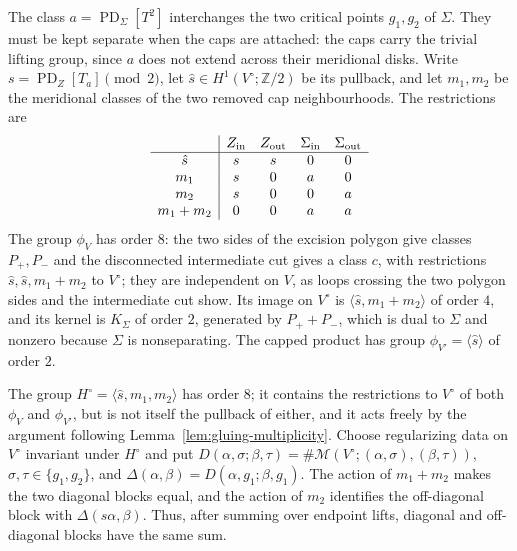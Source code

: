 \documentclass[11pt]{amsart}
\theoremstyle{definition}
\theoremstyle{remark}
\theoremstyle{plain}
\numberwithin{equation}{section}
\newcommand{\ZZ}{\mathbb Z}
\newcommand{\PD}{\operatorname{PD}}
\begin{document}
The class $a=\PD_\Sigma[T^2]$ interchanges the two critical points $g_1,g_2$
of $\Sigma$. They must be kept separate when the caps are attached: the caps
carry the trivial lifting group, since $a$ does not extend across their
meridional disks. Write $s=\PD_Z[T_a]\pmod2$, let $\hat s\in H^1(V^\circ;\ZZ/2)$
be its pullback, and let $m_1,m_2$ be the meridional classes of the two
removed cap neighbourhoods. The restrictions are
\[
\begin{array}{c|cccc}
 &Z_{\rm in}&Z_{\rm out}&\Sigma_{\rm in}&\Sigma_{\rm out}\\\hline
 \hat s&s&s&0&0\\
 m_1&s&0&a&0\\
 m_2&s&0&0&a\\
 m_1+m_2&0&0&a&a
\end{array}
\]
The group $\phi_V$ has order $8$: the two sides of the excision polygon give
classes $P_+,P_-$ and the disconnected intermediate cut gives a class $c$,
with restrictions $\hat s,\hat s,m_1+m_2$ to $V^\circ$; they are independent
on $V$, as loops crossing the two polygon sides and the intermediate cut show.
Its image on $V^\circ$ is $\langle\hat s,m_1+m_2\rangle$ of order $4$, and its
kernel is $K_\Sigma$ of order $2$, generated by $P_++P_-$, which is dual to
$\Sigma$ and nonzero because $\Sigma$ is nonseparating. The capped product has
group $\phi_{V'}=\langle\hat s\rangle$ of order $2$.

The group $H^\circ=\langle\hat s,m_1,m_2\rangle$ has order $8$; it contains the restrictions to
$V^\circ$ of both $\phi_V$ and $\phi_{V'}$, but is not itself the pullback of either, and it acts
freely by the argument following Lemma~\ref{lem:gluing-multiplicity}. Choose regularizing data on
$V^\circ$ invariant under $H^\circ$ and put
$D(\alpha,\sigma;\beta,\tau)=\#\mathcal M(V^\circ;(\alpha,\sigma),(\beta,\tau))$,
$\sigma,\tau\in\{g_1,g_2\}$, and $\Delta(\alpha,\beta)=D(\alpha,g_1;\beta,g_1)$.
The action of $m_1+m_2$ makes the two diagonal blocks equal, and the action of
$m_2$ identifies the off-diagonal block with $\Delta(s\alpha,\beta)$. Thus,
after summing over endpoint lifts, diagonal and off-diagonal blocks have the
same sum.
\end{document}
